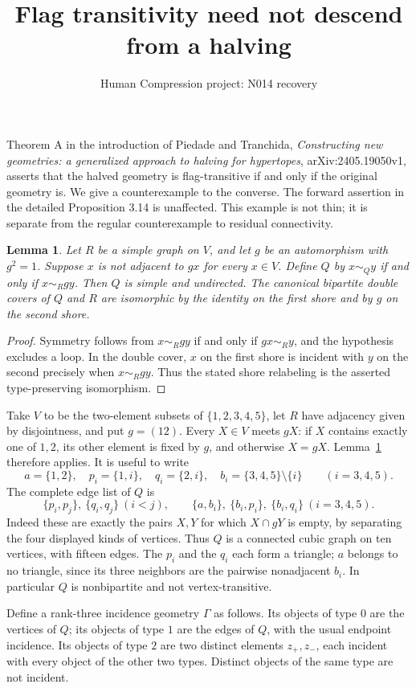 \documentclass[11pt,a4paper]{article}
\title{Flag transitivity need not descend from a halving}
\author{Human Compression project: N014 recovery}
\date{}
\newtheorem{lemma}{Lemma}
\begin{document}
\maketitle
Theorem A in the introduction of Piedade and Tranchida,
\emph{Constructing new geometries: a generalized approach to
halving for hypertopes}, arXiv:2405.19050v1, asserts that the halved
geometry is flag-transitive if and only if the original geometry is.
We give a counterexample to the converse. The forward assertion in
the detailed Proposition 3.14 is unaffected. This example is not thin;
it is separate from the regular counterexample to residual connectivity.

\begin{lemma}\label{twist}
Let $R$ be a simple graph on $V$, and let $g$ be an automorphism with
$g^2=1$. Suppose $x$ is not adjacent to $gx$ for every $x\in V$.
Define $Q$ by $x\sim_Q y$ if and only if $x\sim_R gy$.
Then $Q$ is simple and undirected. The canonical bipartite double
covers of $Q$ and $R$ are isomorphic by the identity on the first
shore and by $g$ on the second shore.
\end{lemma}
\begin{proof}
Symmetry follows from $x\sim_R gy$ if and only if $gx\sim_R y$,
and the hypothesis excludes a loop. In the double cover, $x$ on the
first shore is incident with $y$ on the second precisely when
$x\sim_R gy$. Thus the stated shore relabeling is the asserted
type-preserving isomorphism.
\end{proof}

Take $V$ to be the two-element subsets of $\{1,2,3,4,5\}$, let
$R$ have adjacency given by disjointness, and put $g=(12)$.
Every $X\in V$ meets $gX$: if $X$ contains exactly one of $1,2$,
its other element is fixed by $g$, and otherwise $X=gX$.
Lemma~\ref{twist} therefore applies. It is useful to write
\[
 a=\{1,2\},\quad p_i=\{1,i\},\quad q_i=\{2,i\},\quad
 b_i=\{3,4,5\}\setminus\{i\}\qquad(i=3,4,5).
\]
The complete edge list of $Q$ is
\[
 \{p_i,p_j\},\ \{q_i,q_j\}\ (i<j),\qquad
 \{a,b_i\},\ \{b_i,p_i\},\ \{b_i,q_i\}\ (i=3,4,5).
\]
Indeed these are exactly the pairs $X,Y$ for which $X\cap gY$ is
empty, by separating the four displayed kinds of vertices. Thus
$Q$ is a connected cubic graph on ten vertices, with fifteen edges.
The $p_i$ and the $q_i$ each form a triangle; $a$ belongs to no
triangle, since its three neighbors are the pairwise nonadjacent
$b_i$. In particular $Q$ is nonbipartite and not vertex-transitive.

Define a rank-three incidence geometry $\Gamma$ as follows. Its
objects of type $0$ are the vertices of $Q$; its objects of type $1$
are the edges of $Q$, with the usual endpoint incidence. Its objects
of type $2$ are two distinct elements $z_+,z_-$, each incident with
every object of the other two types. Distinct objects of the same
type are not incident.
\end{document}
